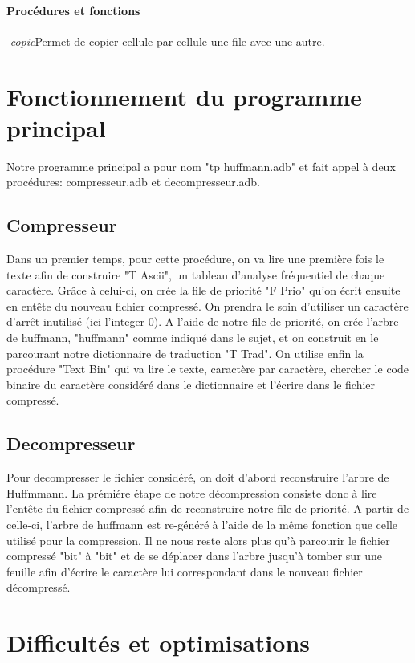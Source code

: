\documentclass[11pt]{article}
\begin{document}
\paragraph{Procédures et fonctions}-\emph{copie}Permet de copier cellule par cellule une file avec une autre.

\section{Fonctionnement du programme principal}
Notre programme principal a pour nom "tp huffmann.adb" et fait appel à deux procédures: compresseur.adb et decompresseur.adb. 

\subsection{Compresseur}
Dans un premier temps, pour cette procédure, on va lire une première fois le texte afin de construire "T Ascii", un tableau d'analyse fréquentiel de chaque caractère. Grâce à celui-ci, on crée la file de priorité "F Prio" qu'on écrit ensuite en entête du nouveau fichier compressé. On prendra le soin d'utiliser un caractère d'arrêt inutilisé (ici l'integer 0). A l'aide de notre file de priorité, on crée l'arbre de huffmann, "huffmann" comme indiqué dans le sujet, et on construit en le parcourant notre dictionnaire de traduction "T Trad". On utilise enfin la procédure "Text Bin" qui va lire le texte, caractère par caractère, chercher le code binaire du caractère considéré dans le dictionnaire et l'écrire dans le fichier compressé.

\subsection{Decompresseur}
Pour decompresser le fichier considéré, on doit d'abord reconstruire l'arbre de Huffmmann. La prémiére étape de notre décompression consiste donc à lire l'entête du fichier compressé afin de reconstruire notre file de priorité. A partir de celle-ci, l'arbre de huffmann est re-généré à l'aide de la même fonction que celle utilisé pour la compression. Il ne nous reste alors plus qu'à parcourir le fichier compressé "bit" à "bit" et de se déplacer dans l'arbre jusqu'à tomber sur une feuille afin d'écrire le caractère lui correspondant dans le nouveau fichier décompressé.

\section{Difficultés et optimisations}
\end{document}
